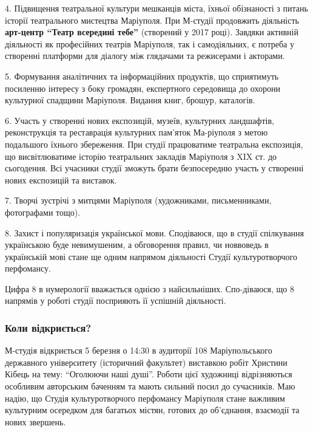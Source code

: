 4. Підвищення театральної культури мешканців міста, їхньої обізнаності з питань
історії театрального мистецтва Маріуполя. При М-студії продовжить діяльність
\textbf{арт-центр \enquote{Театр всередині тебе}} (створений у 2017 році). Завдяки активній
діяльності як професійних театрів Маріуполя, так і самодіяльних, є потреба у
створенні платформи для діалогу між глядачами та режисерами і акторами.

5. Формування аналітичних та інформаційних продуктів, що сприятимуть посиленню
інтересу з боку громадян, експертного середовища до охорони культурної спадщини
Маріуполя. Видання книг, брошур, каталогів.

6. Участь у створенні нових експозицій, музеїв, культурних ландшафтів,
реконструкція та реставрація культурних пам'яток Ма\hyp{}ріуполя з метою подальшого
їхнього збереження. При студії працюватиме театральна експозиція, що
висвітлюватиме історію театральних закладів Маріуполя з XIX ст. до сьогодення.
Всі учасники студії зможуть брати безпосередню участь у створенні нових
експозицій та виставок.

7. Творчі зустрічі з митцями Маріуполя (художниками, письменниками, фотографами
тощо).

8. Захист і популяризація української мови. Сподіваюся, що в студії спілкування
українською буде невимушеним, а обговорення правил, чи новвоведь в українській
мові стане ще одним напрямом діяльності Студії культуротворчого перфомансу.

Цифра 8 в нумерології вважається однією з найсильніших. Спо\hyp{}діваюся, що 8
напрямів у роботі студії посприяють її успішній діяльності.

\subsubsection{Коли відкриється?}

М-студія відкриється 5 березня о 14:30 в аудиторії 108 Маріупольського
державного університету (історичний факультет) виставкою робіт Христини Кібець
на тему: \enquote{Оголюючи наші душі}. Роботи цієї художниці відрізняються особливим
авторським баченням та мають сильний посил до сучасників. Маю надію, що Студія
культуротворчого перфомансу Маріуполя стане важливим культурним осередком для
багатьох містян, готових до об'єднання, взаємодії та нових звершень.
